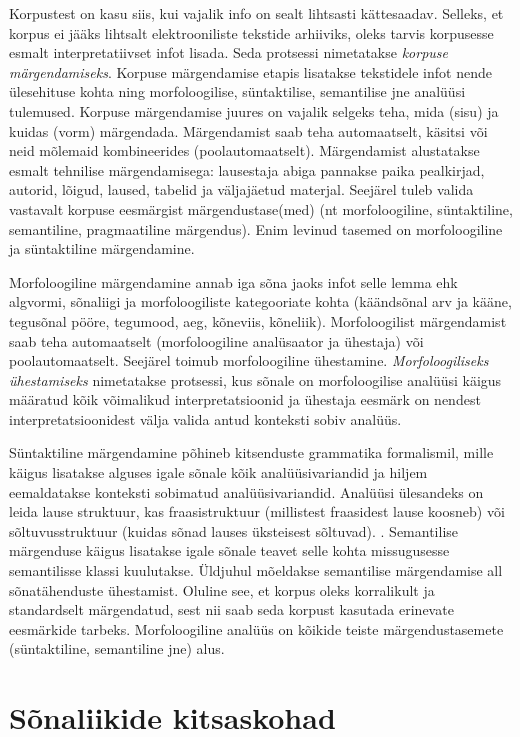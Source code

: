 \documentclass[12pt]{article}
\begin{document}
Korpustest on kasu siis, kui vajalik info on sealt lihtsasti kättesaadav. Selleks, et korpus ei jääks lihtsalt elektrooniliste tekstide arhiiviks, oleks tarvis korpusesse esmalt interpretatiivset infot lisada. Seda protsessi nimetatakse \emph{korpuse märgendamiseks}. Korpuse märgendamise etapis lisatakse tekstidele infot nende ülesehituse
kohta ning morfoloogilise, süntaktilise, semantilise jne analüüsi tulemused. Korpuse märgendamise juures on vajalik selgeks teha, mida (sisu) ja kuidas (vorm) märgendada. Märgendamist saab teha automaatselt, käsitsi või neid mõlemaid kombineerides (poolautomaatselt). Märgendamist alustatakse esmalt tehnilise märgendamisega: lausestaja abiga pannakse paika pealkirjad, autorid, lõigud, laused, tabelid ja väljajäetud materjal. Seejärel tuleb valida vastavalt korpuse eesmärgist märgendustase(med) (nt morfoloogiline,
süntaktiline, semantiline, pragmaatiline märgendus). Enim levinud tasemed on morfoloogiline ja süntaktiline märgendamine. \citep[12--13]{KR}

Morfoloogiline märgendamine annab iga sõna jaoks infot selle lemma ehk algvormi, sõnaliigi ja morfoloogiliste kategooriate kohta (käändsõnal arv ja kääne, tegusõnal pööre, tegumood, aeg, kõneviis, kõneliik). Morfoloogilist märgendamist saab teha automaatselt (morfoloogiline analüsaator ja ühestaja) või poolautomaatselt. Seejärel toimub morfoloogiline ühestamine. \emph{Morfoloogiliseks ühestamiseks} nimetatakse protsessi, kus sõnale on morfoloogilise analüüsi käigus määratud kõik võimalikud interpretatsioonid ja ühestaja eesmärk on nendest interpretatsioonidest välja valida antud konteksti sobiv analüüs.\citep{KV}

Süntaktiline märgendamine põhineb kitsenduste grammatika formalismil, mille käigus lisatakse alguses igale sõnale kõik analüüsivariandid ja hiljem eemaldatakse konteksti sobimatud analüüsivariandid. Analüüsi ülesandeks on leida lause struktuur, kas fraasistruktuur (millistest fraasidest lause koosneb) või sõltuvusstruktuur (kuidas sõnad lauses üksteisest sõltuvad). \citep[13, 17]{M2000}. Semantilise märgenduse käigus lisatakse igale sõnale teavet selle kohta missugusesse semantilisse klassi kuulutakse. Üldjuhul mõeldakse semantilise
märgendamise all sõnatähenduste ühestamist. Oluline see, et korpus oleks korralikult ja standardselt märgendatud,
sest nii saab seda korpust kasutada erinevate eesmärkide tarbeks. Morfoloogiline analüüs on kõikide teiste märgendustasemete (süntaktiline, semantiline jne) alus. \citep[13--14]{KR}

\section{Sõnaliikide kitsaskohad}
\end{document}
